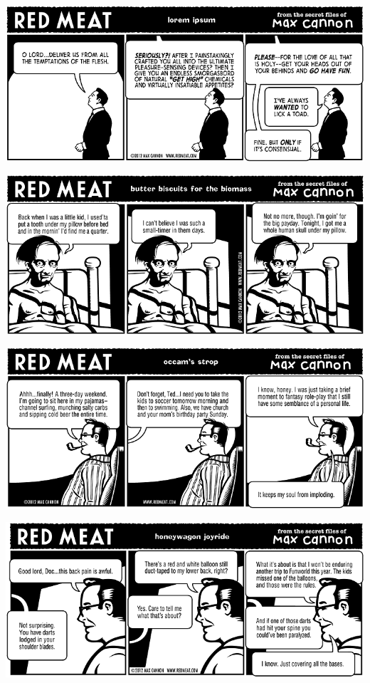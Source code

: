 \documentclass[a4paper,twoside,11pt]{article}
\begin{document}
\includegraphics[width=\textwidth]{redmeat_2012-05-01.png}



\includegraphics[width=\textwidth]{redmeat_2012-05-08.png}



\includegraphics[width=\textwidth]{redmeat_2012-05-15.png}



\includegraphics[width=\textwidth]{redmeat_2012-05-22.png}
\end{document}
